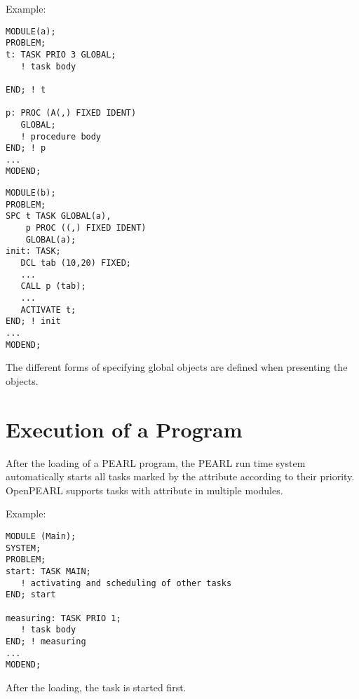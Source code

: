 
Example:

\begin{multicols}{2}
\begin{lstlisting}
MODULE(a);
PROBLEM; 
t: TASK PRIO 3 GLOBAL;
   ! task body
	
END; ! t
        
p: PROC (A(,) FIXED IDENT)
   GLOBAL;       
   ! procedure body
END; ! p         
...             
MODEND;     

\end{lstlisting}
\columnbreak
\begin{lstlisting}
MODULE(b);
PROBLEM; 
SPC t TASK GLOBAL(a),
    p PROC ((,) FIXED IDENT)
    GLOBAL(a);
init: TASK;
   DCL tab (10,20) FIXED;
   ...
   CALL p (tab);
   ... 
   ACTIVATE t;
END; ! init
...
MODEND;
\end{lstlisting}
\end{multicols}

The different forms of specifying global objects are defined when
presenting the objects.

\section{Execution of a Program}   %
\label{sec_program_execution}

After the loading of a PEARL program, the PEARL run time system
automatically starts all tasks marked by the attribute  according
to their priority.  
OpenPEARL supports tasks with attribute  in multiple modules.

Example:

\begin{lstlisting}
MODULE (Main); 
SYSTEM; 
PROBLEM;
start: TASK MAIN;
   ! activating and scheduling of other tasks
END; start
             
measuring: TASK PRIO 1;
   ! task body 
END; ! measuring
...    
MODEND;
\end{lstlisting}

After the loading, the task  is started first.

